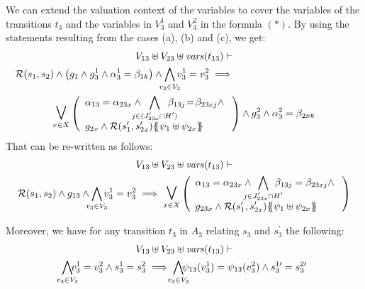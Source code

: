 \documentclass[runningheads]{llncs}
\begin{document}
\begin{enumerate}
We can extend the valuation context of the variables to cover the variables of the transitions $t_3$ and the variables in $V_3^1$ and $V_3^2$ in the formula $(*)$.  
By   using the statements resulting from the cases (a), (b) and (c), we get:
\begin{multline*}
V_{13} \uplus V_{23}  \uplus \fvars{t_{13}} \vdash\\
\mathcal{R}\mpar{s_1, s_{2}} \wedge \mpar{g_1 \wedge g^1_3 \wedge \alpha^1_3=\beta_{1k}}\wedge \bigwedge_\subbox{v_3\in V_3}  v^1_3=v^2_3 %
\implies  \hspace{12em}\\
\operatorname*{\bigsymb{\bigvee}}_{x \in X} \mpar{\everymath{\displaystyle}
\begin{array}{l}
			\alpha_{13} = \alpha_{23x} \wedge \bigwedge_\subbox{j \in (J'_{23x} \cap H')} \beta_{13j}\! =\! \beta_{23xj}\nwedge\\
			  g_{2x} \wedge \mathcal{R}\mpar{s'_1, s'_{2x}}\psubst{\psi_1 \uplus \psi_{2x}}
		\end{array}}  \wedge g^2_3 \wedge \alpha^2_3=\beta_{2xk} 
\end{multline*}	
That can be re-written as follows:
\begin{multline*}
V_{13} \uplus V_{23} \uplus \fvars{t_{13}}  \vdash\\
\mathcal{R}\mpar{s_1, s_{2}} \wedge g_{13}  \land \bigwedge_\subbox{v_3\in V_3} v^1_3=v^2_3
\implies  \operatorname*{\bigsymb{\bigvee}}_{x \in X} \mpar{\everymath{\displaystyle}
\begin{array}{l}
			\alpha_{13} = \alpha_{23x} \wedge \bigwedge_\subbox{j \in J'_{23x} \cap H'} \beta_{13j} = \beta_{23xj} \nwedge\\
			g_{23x} \wedge \mathcal{R}\mpar{s'_1, s'_{2x}}\psubst{\psi_1 \uplus \psi_{2x}}
		\end{array}}   
\end{multline*}	

Moreover, we have  for any transition $t_3$ in $A_3$ relating $s_3$ and $s^{\prime}_3$ the following:
\begin{multline*}
V_{13} \uplus V_{23}  \uplus \fvars{t_{13}} \vdash\\
\bigwedge_\subbox{v_3\in V_3}\!\! v^1_3=v^2_3  \wedge s^1_3 = s^2_3 \implies \bigwedge_\subbox{v_3\in V_3}\!\! \psi_{13}(v^1_3)=\psi_{13}(v^2_3)  \wedge s^{1\prime}_3 = s^{2\prime}_3 
\end{multline*}


\end{enumerate}
\end{document}
